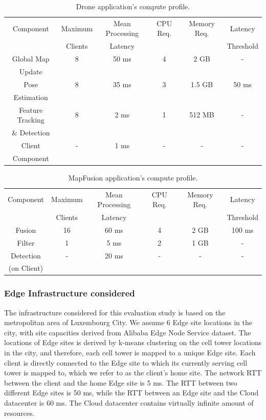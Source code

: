 \begin{table}[h!]
\centering
\begin{tabular}{||c | c | c | c | c | c ||} 
 \hline
 Component & Maximum & Mean Processing  & CPU Req. & Memory Req. & Latency  \\
 & Clients & Latency & & & Threshold \\
 \hline\hline
 Global Map & 8 & 50 ms & 4 & 2 GB & - \\
 Update & & & & & \\
 \hline
 Pose & 8 & 35 ms & 3 & 1.5 GB & 50 ms \\ 
 Estimation & & & & & \\
 \hline
 Feature Tracking & 8 & 2 ms & 1 & 512 MB & - \\
 \& Detection & & & & & \\
 \hline
 Client & - & 1 ms & - & - & - \\
 Component & & & & & \\
 \hline
\end{tabular}
\caption{Drone application's compute profile.}
\label{table:drone_profile}
\end{table}

\begin{table}[h!]
\centering
\begin{tabular}{||c | c | c | c | c | c ||} 
 \hline
 Component & Maximum & Mean Processing  & CPU Req. & Memory Req. & Latency  \\
 & Clients & Latency & & & Threshold \\
 \hline\hline
 Fusion & 16 & 60 ms & 4 & 2 GB & 100 ms \\
 \hline
 Filter & 1 & 5 ms & 2 & 1 GB & - \\ 
 \hline
 Detection & - & 20 ms & - & - & - \\
 (on Client) & & & & & \\
 \hline
\end{tabular}
\caption{MapFusion application's compute profile.}
\label{table:mapfusion_profile}
\end{table}

\subsubsection{Edge Infrastructure considered}
The infrastructure considered for this evaluation study is based on the metropolitan area of Luxembourg City. We assume 6 Edge site locations in the city, with site capacities derived from Alibaba Edge Node Service dataset. The locations of Edge sites is derived by k-means clustering on the cell tower locations in the city, and therefore, each cell tower is mapped to a unique Edge site. Each client is directly connected to the Edge site to which its currently serving cell tower is mapped to, which we refer to as the client's home site. The network RTT between the client and the home Edge site is 5 ms. The RTT between two different Edge sites is 50 ms, while the RTT between an Edge site and the Cloud datacenter is 60 ms. The Cloud datacenter contains virtually infinite amount of resources.

